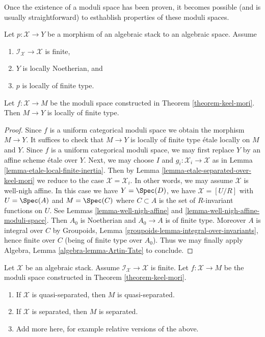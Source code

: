 \noindent
Once the existence of a moduli space has been proven,
it becomes possible (and is usually straightforward) to
esthablish properties of these moduli spaces.

\begin{lemma}
\label{lemma-keel-mori-finite-type}
Let $p : \mathcal{X} \to Y$ be a morphism of an algebraic stack to an
algebraic space. Assume
\begin{enumerate}
\item $\mathcal{I}_\mathcal{X} \to \mathcal{X}$ is finite,
\item $Y$ is locally Noetherian, and
\item $p$ is locally of finite type.
\end{enumerate}
Let $f : \mathcal{X} \to M$ be the moduli space constructed in
Theorem \ref{theorem-keel-mori}.
Then $M \to Y$ is locally of finite type.
\end{lemma}

\begin{proof}
Since $f$ is a uniform categorical moduli space we obtain the
morphism $M \to Y$. It suffices to check that $M \to Y$
is locally of finite type \'etale locally on $M$ and $Y$.
Since $f$ is a uniform categorical moduli space, we
may first replace $Y$ by an affine scheme \'etale over $Y$.
Next, we may choose $I$ and $g_i : \mathcal{X}_i \to \mathcal{X}$
as in Lemma \ref{lemma-etale-local-finite-inertia}.
Then by Lemma \ref{lemma-etale-separated-over-keel-mori}
we reduce to the case $\mathcal{X} = \mathcal{X}_i$.
In other words, we may assume $\mathcal{X}$ is well-nigh affine.
In this case we have $Y = \Spec(D)$, we have
$\mathcal{X} = [U/R]$ with $U = \Spec(A)$ and
$M = \Spec(C)$ where $C \subset A$ is the set of $R$-invariant
functions on $U$. See
Lemmas \ref{lemma-well-nigh-affine} and
\ref{lemma-well-nigh-affine-moduli-space}.
Then $A_0$ is Noetherian and $A_0 \to A$ is of finite type.
Moreover $A$ is integral over $C$ by
Groupoids, Lemma \ref{groupoids-lemma-integral-over-invariants},
hence finite over $C$
(being of finite type over $A_0$).
Thus we may finally apply
Algebra, Lemma \ref{algebra-lemma-Artin-Tate}
to conclude.
\end{proof}

\begin{lemma}
\label{lemma-keel-mori-diagonal}
Let $\mathcal{X}$ be an algebraic stack. Assume
$\mathcal{I}_\mathcal{X} \to \mathcal{X}$ is finite.
Let $f : \mathcal{X} \to M$ be the moduli space constructed in
Theorem \ref{theorem-keel-mori}.
\begin{enumerate}
\item If $\mathcal{X}$ is quasi-separated, then $M$ is quasi-separated.
\item If $\mathcal{X}$ is separated, then $M$ is separated.
\item Add more here, for example relative versions of the above.
\end{enumerate}
\end{lemma}

